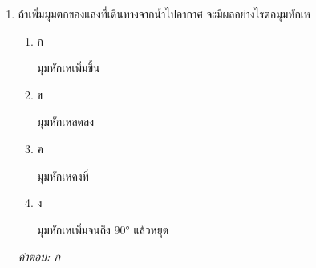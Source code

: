 \documentclass[12pt]{article}
\begin{document}
\begin{enumerate}[label=\arabic*., itemsep=0.5\baselineskip, topsep=0.5\baselineskip, leftmargin=*]
\item ถ้าเพิ่มมุมตกของแสงที่เดินทางจากน้ำไปอากาศ จะมีผลอย่างไรต่อมุมหักเห
\begin{enumerate}[label=\alph*)., itemsep=0.3\baselineskip, topsep=0.3\baselineskip]
\item ก\ 
\begin{minipage}[t]{0.9\linewidth}
\raggedright มุมหักเหเพิ่มขึ้น
\end{minipage}
\item ข\ 
\begin{minipage}[t]{0.9\linewidth}
\raggedright มุมหักเหลดลง
\end{minipage}
\item ค\ 
\begin{minipage}[t]{0.9\linewidth}
\raggedright มุมหักเหคงที่
\end{minipage}
\item ง\ 
\begin{minipage}[t]{0.9\linewidth}
\raggedright มุมหักเหเพิ่มจนถึง 90° แล้วหยุด
\end{minipage}
\end{enumerate}
\vspace{-0.3\baselineskip}
\begin{small}
\textit{คำตอบ: ก}
\end{small}

\end{enumerate}
\end{document}
